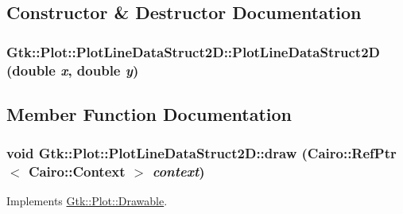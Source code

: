 \subsection{Constructor \& Destructor Documentation}
\hypertarget{structGtk_1_1Plot_1_1PlotLineDataStruct2D_a3f2f9b4ec89a940baea3c1fd3e0da75e}{
\subsubsection[{PlotLineDataStruct2D}]{\setlength{\rightskip}{0pt plus 5cm}Gtk::Plot::PlotLineDataStruct2D::PlotLineDataStruct2D (double {\em x}, \/  double {\em y})}}
\label{structGtk_1_1Plot_1_1PlotLineDataStruct2D_a3f2f9b4ec89a940baea3c1fd3e0da75e}


\subsection{Member Function Documentation}
\hypertarget{structGtk_1_1Plot_1_1PlotLineDataStruct2D_ad3f4c1ed94cc37644032ac3be8995e1d}{
\subsubsection[{draw}]{\setlength{\rightskip}{0pt plus 5cm}void Gtk::Plot::PlotLineDataStruct2D::draw (Cairo::RefPtr$<$ Cairo::Context $>$ {\em context})}}
\label{structGtk_1_1Plot_1_1PlotLineDataStruct2D_ad3f4c1ed94cc37644032ac3be8995e1d}


Implements \hyperlink{classGtk_1_1Plot_1_1Drawable_ab1c723fcea852515f17d933e66b63ed2}{Gtk::Plot::Drawable}.


